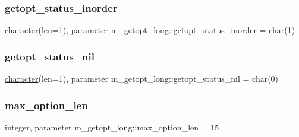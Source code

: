 \subsubsection{\texorpdfstring{getopt\+\_\+status\+\_\+inorder}{getopt\_status\_inorder}}
{\footnotesize\ttfamily \hyperlink{option__stopwatch_83_8txt_abd4b21fbbd175834027b5224bfe97e66}{character}(len=1), parameter m\+\_\+getopt\+\_\+long\+::getopt\+\_\+status\+\_\+inorder = char(1)}

\mbox{\label{namespacem__getopt__long_a17bc8c03e862e68f855f3c85740fe4c2}} 
\subsubsection{\texorpdfstring{getopt\+\_\+status\+\_\+nil}{getopt\_status\_nil}}
{\footnotesize\ttfamily \hyperlink{option__stopwatch_83_8txt_abd4b21fbbd175834027b5224bfe97e66}{character}(len=1), parameter m\+\_\+getopt\+\_\+long\+::getopt\+\_\+status\+\_\+nil = char(0)}

\mbox{\label{namespacem__getopt__long_aa7e9d6f7c81a30df80cba5f518928d0b}} 
\subsubsection{\texorpdfstring{max\+\_\+option\+\_\+len}{max\_option\_len}}
{\footnotesize\ttfamily integer, parameter m\+\_\+getopt\+\_\+long\+::max\+\_\+option\+\_\+len = 15}

